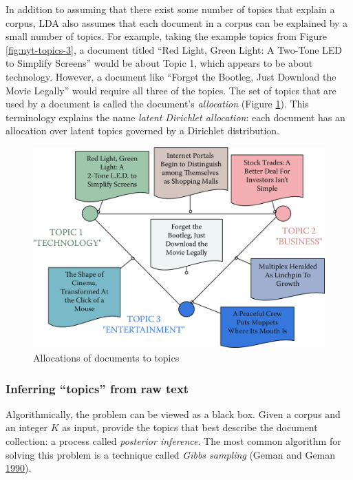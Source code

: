 \documentclass[]{krantz}
\begin{document}
In addition to assuming that there exist some number of topics that
explain a corpus, LDA also assumes that each document in a corpus can be
explained by a small number of topics. For example, taking the example
topics from Figure \ref{fig:nyt-topics-3}, a document titled ``Red
Light, Green Light: A Two-Tone LED to Simplify Screens'' would be about
Topic 1, which appears to be about technology. However, a document like
``Forget the Bootleg, Just Download the Movie Legally'' would require
all three of the topics. The set of topics that are used by a document
is called the document's \emph{allocation} (Figure
\ref{fig:nyt-documents}). This terminology explains the name
\emph{latent Dirichlet allocation}: each document has an allocation over
latent topics governed by a Dirichlet distribution.

\begin{figure}

{\centering \includegraphics[width=0.7\linewidth]{ChapterText/figures/nyt_documents} 

}

\caption{Allocations of documents to topics}\label{fig:nyt-documents}
\end{figure}

\vspace*{-12pt}

\subsubsection{\texorpdfstring{Inferring ``topics'' from raw
text}{Inferring topics from raw text}}\label{inferring-topics-from-raw-text}

Algorithmically, the problem can be viewed as a black box. Given a
corpus and an integer \(K\) as input, provide the topics that best
describe the document collection: a process called \emph{posterior
inference}. The most common algorithm for solving this problem is a
technique called \emph{Gibbs sampling} (Geman and Geman
\protect\hyperlink{ref-geman-90}{1990}).
\end{document}
